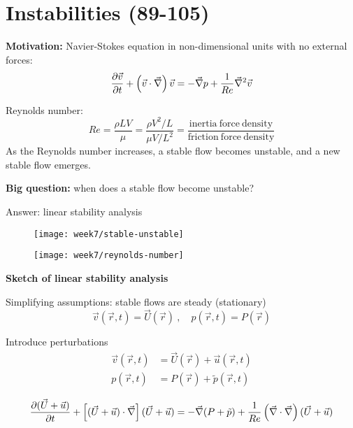 \section{Instabilities (89-105)}

\textbf{Motivation:} Navier-Stokes equation in non-dimensional units with no external forces:
\begin{equation}
\frac{\partial \vec{v}}{\partial t}+\left(\vec{v}\cdot\vec{\nabla}\right)\vec{v} = -\vec{\nabla}p+\frac{1}{Re}\vec{\nabla}^2\vec{v}
\end{equation}

Reynolds number:
\begin{equation}
Re = \frac{\rho LV}{\mu}=\frac{\rho V^2/L}{\mu V/L^2}=\frac{\mathrm{inertia\ force\ density}}{\mathrm{friction\ force\ density}}
\end{equation}
As the Reynolds number increases, a stable flow becomes unstable, and a new stable flow emerges.

\textbf{Big question:} when does a stable flow become unstable?

Answer: linear stability analysis

\begin{figure}[h]
    \centering
    \texttt{[image: week7/stable-unstable]}\\
    \caption{}
    \label{fig:stable-unstable}
\end{figure}


\begin{figure}[p]
    \centering
    \texttt{[image: week7/reynolds-number]}\\
    \caption{}
    \label{fig:reynolds-number}
\end{figure}


\textbf{Sketch of linear stability analysis}

Simplifying assumptions: stable flows are steady (stationary)
\begin{equation}
\vec{v}(\vec{r},t)=\vec{U}(\vec{r})\ ,\quad p(\vec{r},t)=P(\vec{r})
\end{equation}

Introduce perturbations
\begin{align}
\vec{v}(\vec{r},t)&=\vec{U}(\vec{r})+\vec{u}(\vec{r},t)\\
p(\vec{r},t)&=P(\vec{r})+\tilde{p}(\vec{r},t)
\end{align}

\begin{equation}
\frac{\partial (\vec{U}+\vec{u})}{\partial t}+\left[(\vec{U}+\vec{u})\cdot\vec{\nabla}\right](\vec{U}+\vec{u}) = -\vec{\nabla}(P+\tilde{p})+\frac{1}{Re}\left(\vec{\nabla}\cdot\vec\nabla\right)(\vec{U}+\vec{u})
\end{equation}

